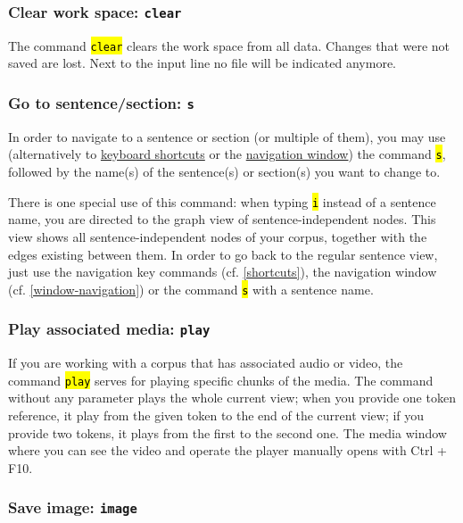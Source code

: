 \documentclass[12pt]{scrartcl}
\newcommand{\code}[1]{\hl{\texttt{#1}}}
\begin{document}
\subsubsection{Clear work space: \texttt{clear}}

The command \code{clear} clears the work space from all data.
Changes that were not saved are lost.
Next to the input line no file will be indicated anymore.


\subsubsection{Go to sentence/section: \texttt{s}}\label{befehl-s}

In order to navigate to a sentence or section (or multiple of them), you may use (alternatively to \hyperref[shortcuts]{keyboard shortcuts} or the \hyperref[window-navigation]{navigation window}) the command \code{s}, followed by the name(s) of the sentence(s) or section(s) you want to change to.

There is one special use of this command: when typing \code{i} instead of a sentence name, you are directed to the graph view of sentence-independent nodes.
This view shows all sentence-independent nodes of your corpus, together with the edges existing between them.
In order to go back to the regular sentence view, just use the navigation key commands (cf. \ref{shortcuts}), the navigation window (cf. \ref{window-navigation}) or the command \code{s} with a sentence name.


\subsubsection{Play associated media: \texttt{play}}\label{befehl-play}

If you are working with a corpus that has associated audio or video, the command \code{play} serves for playing specific chunks of the media.
The command without any parameter plays the whole current view; when you provide one token reference, it play from the given token to the end of the current view; if you provide two tokens, it plays from the first to the second one.
The media window where you can see the video and operate the player manually opens with Ctrl + F10.


\subsubsection{Save image: \texttt{image}}
\end{document}
